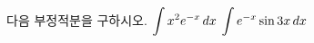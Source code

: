 다음 부정적분을 구하시오.
 $\displaystyle\int x^2e^{-x}\mkern3mu dx$
 $\displaystyle\int e^{-x}\sin 3x\mkern3mu dx$
